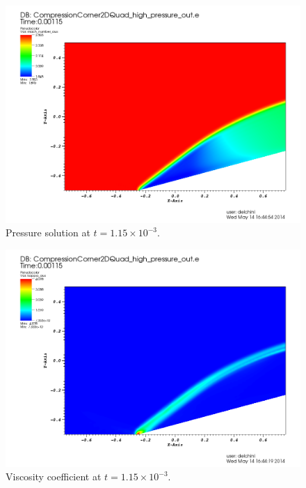           \begin{figure}[H]%
                \centering
                \includegraphics[scale=.50]{figures/CCDensityTime0p00115.png}
                \caption{Pressure solution at $t=1.15 \times 10^{-3}$.}
                \label{fig:2d_cpc_rho_115}
        \end{figure}%
        \begin{figure}[H]%
                \centering
                \includegraphics[scale=.50]{figures/CCViscosityTime0p00115.png}
                \caption{Viscosity coefficient at $t=1.15 \times 10^{-3}$.}
                \label{fig:2d_cpc_visc_115}
        \end{figure}
